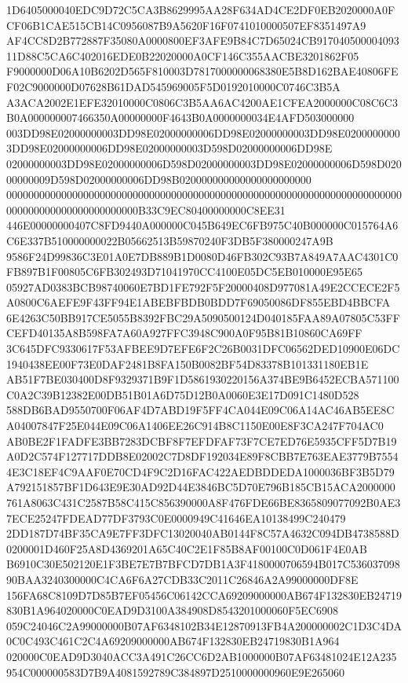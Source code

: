 \documentclass[UTF8,fontset=fandol,zihao=-4,a4paper]{ctexart}
\begin{document}
{{1D6405000040EDC9D72C5CA3B8629995AA28F634AD4CE2DF0EB2020000A0FCF06B1CAE515CB14C0956087B9A5620F16F0741010000507EF8351497A9
AF4CC8D2B772887F35080A0000800EF3AFE9B84C7D65024CB91704050000409311D88C5CA6C402016EDE0B22020000A0CF146C355AACBE3201862F05
F9000000D06A10B6202D565F810003D7817000000068380E5B8D162BAE40806FEF02C9000000D07628B61DAD545969005F5D0192010000C0746C3B5A
A3ACA2002E1EFE32010000C0806C3B5AA6AC4200AE1CFEA2000000C08C6C3B0A000000007466350A00000000F4643B0A0000000034E4AFD503000000
003DD98E02000000003DD98E02000000006DD98E02000000003DD98E02000000003DD98E02000000006DD98E02000000003D598D02000000006DD98E
02000000003DD98E02000000006D598D02000000003DD98E02000000006D598D02000000009D598D02000000006DD98B020000000000000000000000
000000000000000000000000000000000000000000000000000000000000000000000000000000000000000000000000B33C9EC80400000000C8EE31
446E00000000407C8FD9440A000000C045B649EC6FB975C40B000000C015764A6C6E337B510000000022B05662513B59870240F3DB5F380000247A9B
9586F24D99836C3E01A0E7DB889B1D0080D46FB302C93B7A849A7AAC4301C0FB897B1F00805C6FB302493D71041970CC4100E05DC5EB010000E95E65
05927AD0383BCB98740060E7BD1FE792F5F20000408D977081A49E2CCECE2F5A0800C6AEFE9F43FF94E1ABEBFBDB0BDD7F69050086DF855EBD4BBCFA
6E4263C50BB917CE5055B8392FBC29A5090500124D040185FAA89A07805C53FFCEFD40135A8B598FA7A60A927FFC3948C900A0F95B81B10860CA69FF
3C645DFC9330617F53AFBEE9D7EFE6F2C26B0031DFC06562DED10900E06DC1940438EE00F73E0DAF2481B8FA150B0082BF54D83378B101331180EB1E
AB51F7BE030400D8F9329371B9F1D5861930220156A374BE9B6452ECBA571100C0A2C39B12382E00DB51B01A6D75D12B0A0060E3E17D091C1480D528
588DB6BAD9550700F06AF4D7ABD19F5FF4CA044E09C06A14AC46AB5EE8CA04007847F25E044E09C06A1406EE26C914B8C1150E00E8F3CA247F704AC0
AB0BE2F1FADFE3BB7283DCBF8F7EFDFAF73F7CE7ED76E5935CFF5D7B19A0D2C574F127717DDB8E02002C7D8DF192034E89F8CBB7E763EAE3779B7554
4E3C18EF4C9AAF0E70CD4F9C2D16FAC422AEDBDDEDA1000036BF3B5D79A792151857BF1D643E9E30AD92D44E3846BC5D70E796B185CB15ACA2000000
761A8063C431C2587B58C415C856390000A8F476FDE66BE8365809077092B0AE37ECE25247FDEAD77DF3793C0E0000949C41646EA10138499C240479
2DD187D74BF35CA9E7FF3DFC13020040AB0144F8C57A4632C094DB4738588D0200001D460F25A8D4369201A65C40C2E1F85B8AF00100C0D061F4E0AB
B6910C30E502120E1F3BE7E7B7BFCD7DB1A3F4180000706594B017C53603709890BAA3240300000C4CA6F6A27CDB33C2011C26846A2A99000000DF8E
156FA68C8109D7D85B7EF05456C06142CCA69209000000AB674F132830EB24719830B1A964020000C0EAD9D3100A384908D8543201000060F5EC6908
059C24046C2A99000000B07AF6348102B34E12870913FB4A200000002C1D3C4DA0C0C493C461C2C4A69209000000AB674F132830EB24719830B1A964
020000C0EAD9D3040ACC3A491C26CC6D2AB1000000B07AF63481024E12A235954C000000583D7B9A4081592789C384897D2510000000960E9E265060
}}
\end{document}
